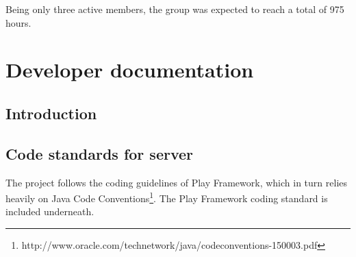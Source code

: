 \documentclass[11pt]{book}
\begin{document}
Being only three active members, the group was expected to reach a total of 975 hours.

\chapter{Developer documentation}\label{chap:documentation}
\section{Introduction}

\section{Code standards for server}\label{sec:codeStandard}
The project follows the coding guidelines of Play Framework\cite{playCodingStandard}, which in turn relies heavily on Java Code Conventions\footnote{http://www.oracle.com/technetwork/java/codeconventions-150003.pdf}. The Play Framework coding standard is included underneath.
\end{document}
